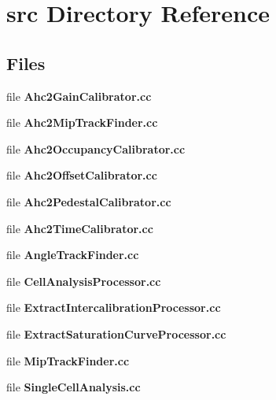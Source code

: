 \section{src Directory Reference}
\label{dir_f072c95c9fbb358972039e17904b419b}
\subsection*{Files}
\begin{DoxyCompactItemize}
\item 
file {\bfseries Ahc2\-Gain\-Calibrator.\-cc}
\item 
file {\bfseries Ahc2\-Mip\-Track\-Finder.\-cc}
\item 
file {\bfseries Ahc2\-Occupancy\-Calibrator.\-cc}
\item 
file {\bfseries Ahc2\-Offset\-Calibrator.\-cc}
\item 
file {\bfseries Ahc2\-Pedestal\-Calibrator.\-cc}
\item 
file {\bfseries Ahc2\-Time\-Calibrator.\-cc}
\item 
file {\bfseries Angle\-Track\-Finder.\-cc}
\item 
file {\bfseries Cell\-Analysis\-Processor.\-cc}
\item 
file {\bfseries Extract\-Intercalibration\-Processor.\-cc}
\item 
file {\bfseries Extract\-Saturation\-Curve\-Processor.\-cc}
\item 
file {\bfseries Mip\-Track\-Finder.\-cc}
\item 
file {\bfseries Single\-Cell\-Analysis.\-cc}
\end{DoxyCompactItemize}
